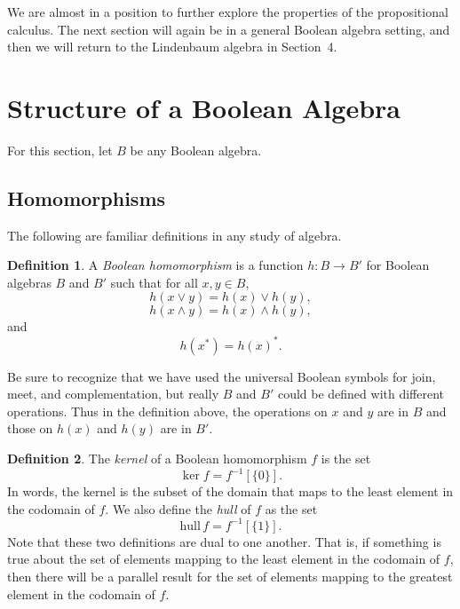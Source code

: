 \documentclass[11pt,titlepage]{article}
\newcommand{\hull}{\text{hull}\,}
\theoremstyle{definition}
\newtheorem{definition}{Definition}[subsection]
\begin{document}
We are almost in a position to further explore the properties of the propositional calculus. The next section will again be in a general Boolean algebra setting, and then we will return to the Lindenbaum algebra in Section~4.


\section{Structure of a Boolean Algebra}\label{struct}

For this section, let $B$ be any Boolean algebra. 
\subsection{Homomorphisms}

The following are familiar definitions in any study of algebra.


\begin{definition} A {\em Boolean homomorphism} is a function $h: B\to B'$ for Boolean algebras $B$ and $B'$ such that for all $x,y\in B$, $$h(x\lor y)=h(x)\lor h(y),$$ $$h( x \land y)=h(x)\land h(y),$$ and $$h(x^*) =  h(x)^*.$$
\end{definition} Be sure to recognize that we have used the universal Boolean symbols for join, meet, and complementation, but really $B$ and $B'$ could be defined with different operations. Thus in the definition above, the operations on $x$ and $y$ are in $B$ and those on $h(x)$ and $h(y)$ are in $B'$.

\begin{definition} The {\em kernel} of a Boolean homomorphism $f$ is the set $$\ker f = f^{-1}[\{0\}].$$ In words, the kernel is the subset of the domain that maps to the least element in the codomain of $f$. We also define the {\em hull} of $f$ as the set $$\hull f= f^{-1}[\{1\}].$$ Note that these two definitions are dual to one another. That is, if something is true about the set of elements mapping to the least element in the codomain of $f$, then there will be a parallel result for the set of elements mapping to the greatest element in the codomain of $f$.\end{definition}
\end{document}
